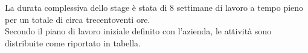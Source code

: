 La durata complessiva dello stage è stata di 8 settimane di lavoro a tempo pieno per un totale di circa trecentoventi ore.\\
\noindent Secondo il piano di lavoro iniziale definito con l'azienda, le attività sono distribuite come riportato in tabella.\\

\begin{comment}

\begin{center}

        \renewcommand{\arraystretch}{1.5}
    
        \centering
        \begin{longtable}{| C{2.5cm} | C{2cm} | L{7.2cm} | }
            
            \hline
            
            \textbf{Durata in ore} & \textbf{Settimana} & \textbf{Descrizione} \\
            
            \hline
            
            40 & 1 &
            \begin{itemize}[leftmargin=*]
                \item Studio delle tecnologie necessarie.
            \end{itemize} \\
            
            \hline
            
            80 & 2, 3 &
            \begin{itemize}[leftmargin=*]
                \item Progettazione e sviluppo di un micro-servizio per attività di \emph{face detection} per 
                la creazione di squadre di gioco;
                \item Integrazione con la piattaforma esistente. 
            \end{itemize}  \\
            
            \hline
        
            
            80 & 4, 5 &
            \begin{itemize}[leftmargin=*]
                \item Progettazione e sviluppo di un micro-servizio per il controllo vocale;
                \item Integrazione con la piattaforma esistente. 
            \end{itemize}  \\
             

\end{comment}
